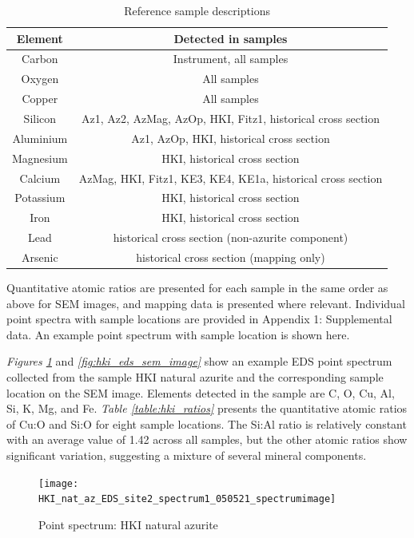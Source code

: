\begin{table}[H]
\caption{Reference sample descriptions}
\centering
\label{table:eds_elems}
\begin{tabular}{c c}
\toprule
Element & Detected in samples \\
\midrule
Carbon & Instrument, all samples \\
Oxygen & All samples \\
Copper & All samples \\
Silicon & Az1, Az2, AzMag, AzOp, HKI, Fitz1, historical cross section \\
Aluminium & Az1, AzOp, HKI, historical cross section \\
Magnesium & HKI, historical cross section \\
Calcium & AzMag, HKI, Fitz1, KE3, KE4, KE1a, historical cross section \\
Potassium & HKI, historical cross section \\
Iron & HKI, historical cross section \\
Lead & historical cross section (non-azurite component) \\
Arsenic & historical cross section (mapping only) \\
\bottomrule
\end{tabular}
\end{table}

Quantitative atomic ratios are presented for each sample in the same order as above for SEM images, and mapping data is presented where relevant. Individual point spectra with sample locations are provided in Appendix 1: Supplemental data. An example point spectrum with sample location is shown here.

\textit{Figures \ref{fig:hki_eds_spectrum}} and \textit{\ref{fig:hki_eds_sem_image}} show an example EDS point spectrum collected from the sample HKI natural azurite and the corresponding sample location on the SEM image. Elements detected in the sample are C, O, Cu, Al, Si, K, Mg, and Fe. \textit{Table \ref{table:hki_ratios}} presents the quantitative atomic ratios of Cu:O and Si:O for eight sample locations. The Si:Al ratio is relatively constant with an average value of 1.42 across all samples, but the other atomic ratios show significant variation, suggesting a mixture of several mineral components.

\begin{figure}[H]
\centering
  \texttt{[image: HKI\_nat\_az\_EDS\_site2\_spectrum1\_050521\_spectrumimage]}
\caption[Point spectrum: HKI natural azurite]{Point spectrum: HKI natural azurite}
\label{fig:hki_eds_spectrum}
\end{figure}

